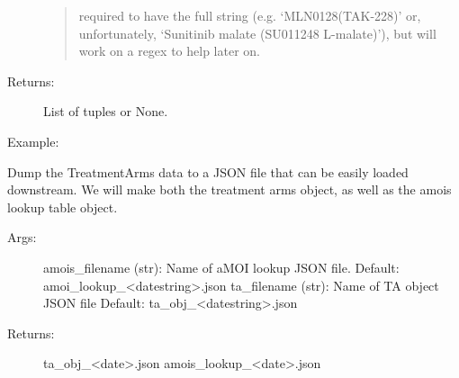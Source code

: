 \documentclass[letterpaper,10pt,english]{sphinxmanual}
\begin{document}
\begin{fulllineitems}
\begin{fulllineitems}
\begin{description}
\begin{quote}
required to have the full string (e.g. ‘MLN0128(TAK-228)’ or, unfortunately,
‘Sunitinib malate (SU011248 L-malate)’), but will work on a regex to
help later on.
\end{quote}

\item[{Returns:}] \leavevmode
List of tuples or None.

\item[{Example:}] \leavevmode
\begin{sphinxVerbatim}[commandchars=\\\{\}]
\end{sphinxVerbatim}

\end{description}

\end{fulllineitems}


\begin{fulllineitems}
\label{\detokenize{matchbox_api_utils:matchbox_api_utils.TreatmentArms.ta_json_dump}}
Dump the TreatmentArms data to a JSON file that can be easily loaded downstream. We will make both the
treatment arms object, as well as the amois lookup table object.
\begin{description}
\item[{Args:}] \leavevmode
amois\_filename (str): Name of aMOI lookup JSON file. Default: amoi\_lookup\_\textless{}datestring\textgreater{}.json
ta\_filename (str): Name of TA object JSON file Default: ta\_obj\_\textless{}datestring\textgreater{}.json

\item[{Returns:}] \leavevmode
ta\_obj\_\textless{}date\textgreater{}.json
amois\_lookup\_\textless{}date\textgreater{}.json

\end{description}

\end{fulllineitems}


\end{fulllineitems}
\end{document}
